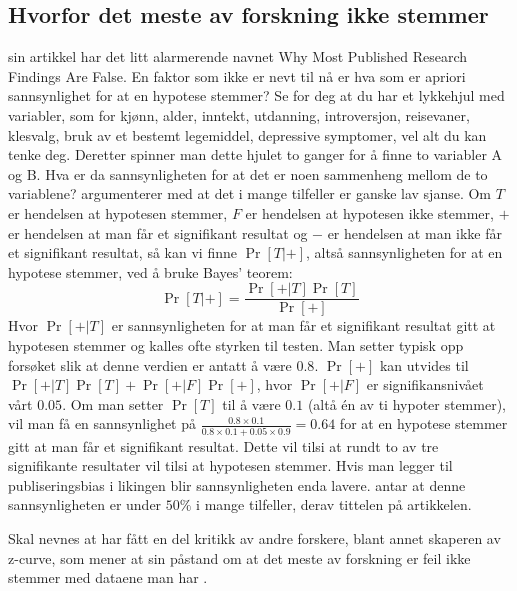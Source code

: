 \documentclass[doc,norsk]{apa7}
\begin{document}
\subsection{Hvorfor det meste av forskning ikke stemmer}
\textcite{forskning-fake} sin artikkel har det litt alarmerende navnet \guillemetleft Why Most Published Research Findings Are False\guillemetright. En faktor som ikke er nevt til nå er hva som er apriori sannsynlighet for at en hypotese stemmer? Se for deg at du har et lykkehjul med variabler, som for kjønn, alder, inntekt, utdanning, introversjon, reisevaner, klesvalg, bruk av et bestemt legemiddel, depressive symptomer, vel alt du kan tenke deg. Deretter spinner man dette hjulet to ganger for å finne to variabler A og B. Hva er da sannsynligheten for at det er noen sammenheng mellom de to variablene? \textcite{forskning-fake} argumenterer med at det i mange tilfeller er ganske lav sjanse.
Om $T$ er hendelsen at hypotesen stemmer, $F$ er hendelsen at hypotesen ikke stemmer, $+$ er hendelsen at man får et signifikant resultat og $-$ er hendelsen at man ikke får et signifikant resultat, så kan vi finne $\Pr[T|+]$, altså sannsynligheten for at en hypotese stemmer, ved å bruke Bayes' teorem:
\begin{equation}
\Pr[T|+] = \frac{\Pr[+|T]\Pr[T]}{\Pr[+]}
\end{equation}
Hvor $\Pr[+|T]$ er sannsynligheten for at man får et signifikant resultat gitt at hypotesen stemmer og kalles ofte styrken til testen. Man setter typisk opp forsøket slik at denne verdien er antatt å være $0.8$. $\Pr[+]$ kan utvides til $\Pr[+|T]\Pr[T] + \Pr[+|F]\Pr[+]$, hvor $\Pr[+|F]$ er signifikansnivået vårt $0.05$. Om man setter $\Pr[T]$ til å være $0.1$ (altå én av ti hypoter stemmer), vil man få en sannsynlighet på $\frac{0.8\times 0.1}{0.8\times 0.1 + 0.05\times 0.9} = 0.64$ for at en hypotese stemmer gitt at man får et signifikant resultat. Dette vil tilsi at rundt to av tre signifikante resultater vil tilsi at hypotesen stemmer. Hvis man legger til publiseringsbias i likingen blir sannsynligheten enda lavere. \textcite{forskning-fake} antar at denne sannsynligheten er under $50\%$ i mange tilfeller, derav tittelen på artikkelen.

Skal nevnes at \textcite{forskning-fake} har fått en del kritikk av andre forskere, blant annet skaperen av z-curve, som mener at \citeauthor{forskning-fake} sin påstand om at det meste av forskning er feil ikke stemmer med dataene man har \parencite{forskning-fake-kritikk}.

\printbibliography
\end{document}
